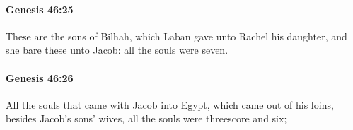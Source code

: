 		\paragraph{Genesis 46:25} %
			\label{GENESIS-46-25}

			These are the sons of Bilhah, which Laban gave unto Rachel his daughter, and she bare these unto Jacob: all the souls were seven.


		\paragraph{Genesis 46:26} %
			\label{GENESIS-46-26}

			All the souls that came with Jacob into Egypt, which came out of his loins, besides Jacob's sons' wives, all the souls were threescore and six;



